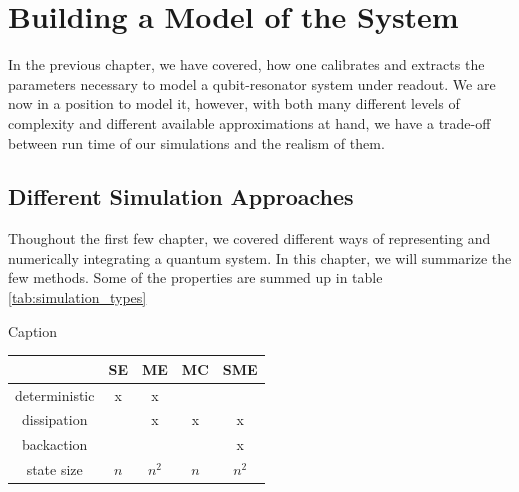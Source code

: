 \chapter{Building a Model of the System}\label{chap:model}
In the previous chapter, we have covered, how one calibrates and extracts the parameters necessary to model a qubit-resonator system under readout. We are now in a position to model it, however, with both many different levels of complexity and different available approximations at hand, we have a trade-off between run time of our simulations and the realism of them. 

\section{Different Simulation Approaches}
Thoughout the first few chapter, we covered different ways of representing and numerically integrating a quantum system. In this chapter, we will summarize the few methods. Some of the properties are summed up in table \ref{tab:simulation_types}

\begin{margintable}
    \caption{Caption}
    \centering
    \begin{tabular}{c|c|c|c|c}
                    &  SE   & ME    & MC    & SME \\ \hline 
    deterministic   & x     & x     &       &      \\
    dissipation     &       & x     & x     & x    \\ 
    backaction      &       &       &       & x    \\
    state size      & $n$   & $n^2$ & $n$   & $n^2$
    \end{tabular}
    \label{tab:simulation_types}
\end{margintable}

